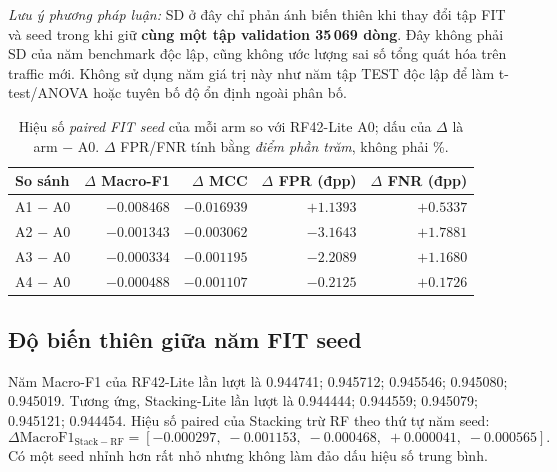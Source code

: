 \begin{table}[htbp]
\begin{minipage}{\linewidth}
\footnotesize\emph{Lưu ý phương pháp luận:} SD ở đây chỉ phản ánh biến thiên khi thay đổi tập FIT và seed trong khi giữ \textbf{cùng một tập validation 35\,069 dòng}. Đây không phải SD của năm benchmark độc lập, cũng không ước lượng sai số tổng quát hóa trên traffic mới. Không sử dụng năm giá trị này như năm tập TEST độc lập để làm t-test/ANOVA hoặc tuyên bố độ ổn định ngoài phân bố.
\end{minipage}
\end{table}

\begin{table}[htbp]\centering
\small
\renewcommand{\arraystretch}{1.24}
\setlength{\tabcolsep}{3pt}
\caption{Hiệu số \emph{paired FIT seed} của mỗi arm so với RF42-Lite A0; dấu của $\Delta$ là arm $-$ A0. $\Delta$ FPR/FNR tính bằng \emph{điểm phần trăm}, không phải \%.}
\label{tab:p21-paired-deltas}
\begin{tabular}{lrrrr}
\toprule
So sánh & $\Delta$ Macro-F1 & $\Delta$ MCC & $\Delta$ FPR (đpp) & $\Delta$ FNR (đpp)\\\midrule
A1 $-$ A0 & $-0.008468$ & $-0.016939$ & $+1.1393$ & $+0.5337$\\
A2 $-$ A0 & $-0.001343$ & $-0.003062$ & $-3.1643$ & $+1.7881$\\
A3 $-$ A0 & $-0.000334$ & $-0.001195$ & $-2.2089$ & $+1.1680$\\
A4 $-$ A0 & $-0.000488$ & $-0.001107$ & $-0.2125$ & $+0.1726$\\\bottomrule
\end{tabular}
\end{table}

\subsection{Độ biến thiên giữa năm FIT seed}
Năm Macro-F1 của RF42-Lite lần lượt là 0.944741; 0.945712; 0.945546; 0.945080; 0.945019. Tương ứng, Stacking-Lite lần lượt là 0.944444; 0.944559; 0.945079; 0.945121; 0.944454. Hiệu số paired của Stacking trừ RF theo thứ tự năm seed:
\[
\Delta \mathrm{MacroF1}_{\mathrm{Stack-RF}} =
[-0.000297,\;-0.001153,\;-0.000468,\;+0.000041,\;-0.000565].
\]
Có một seed nhỉnh hơn rất nhỏ nhưng không làm đảo dấu hiệu số trung bình.

